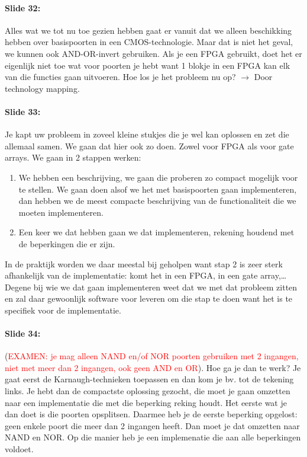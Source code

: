 \documentclass[10pt,a4paper]{book}
\begin{document}
\paragraph{Slide 32:} Alles wat we tot nu toe gezien hebben gaat er vanuit dat we alleen beschikking hebben over basispoorten in een CMOS-technologie. Maar dat is niet het geval, we kunnen ook AND-OR-invert gebruiken. Als je een FPGA gebruikt, doet het er eigenlijk niet toe wat voor poorten je hebt want 1 blokje in een FPGA kan elk van die functies gaan uitvoeren. Hoe los je het probleem nu op? $\rightarrow$ Door technology mapping.

\paragraph{Slide 33:} Je kapt uw probleem in zoveel kleine stukjes die je wel kan oplossen en zet die allemaal samen. We gaan dat hier ook zo doen. Zowel voor FPGA als voor gate arrays. We gaan in 2 stappen werken:
\begin{enumerate}
\item We hebben een beschrijving, we gaan die proberen zo compact mogelijk voor te stellen. We gaan doen alsof we het met basispoorten gaan implementeren, dan hebben we de meest compacte beschrijving van de functionaliteit die we moeten implementeren.
\item Een keer we dat hebben gaan we dat implementeren, rekening houdend met de beperkingen die er zijn. 
\end{enumerate}	
In de praktijk worden we daar meestal bij geholpen want stap 2 is zeer sterk afhankelijk van de implementatie: komt het in een FPGA, in een gate array,\ldots Degene bij wie we dat gaan implementeren weet dat we met dat probleem zitten en zal daar gewoonlijk software voor leveren om die stap te doen want het is te specifiek voor de implementatie.

\paragraph{Slide 34:} (\textcolor{red}{EXAMEN: je mag alleen NAND en/of NOR poorten gebruiken met 2 ingangen, niet met meer dan 2 ingangen, ook geen AND en OR}). Hoe ga je dan te werk? Je gaat eerst de Karnaugh-technieken toepassen en dan kom je bv. tot de tekening links. Je hebt dan de compactste oplossing gezocht, die moet je gaan omzetten naar een implementatie die met die beperking reking houdt. Het eerste wat je dan doet is die poorten opsplitsen. Daarmee heb je de eerste beperking opgelost: geen enkele poort die meer dan 2 ingangen heeft. Dan moet je dat omzetten naar NAND en NOR. Op die manier heb je een implemenatie die aan alle beperkingen voldoet.
\end{document}

